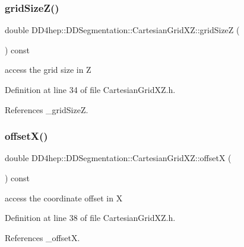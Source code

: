 \subsubsection{\texorpdfstring{grid\+Size\+Z()}{gridSizeZ()}}
{\footnotesize\ttfamily double D\+D4hep\+::\+D\+D\+Segmentation\+::\+Cartesian\+Grid\+X\+Z\+::grid\+SizeZ (\begin{DoxyParamCaption}{ }\end{DoxyParamCaption}) const\hspace{0.3cm}{\ttfamily [inline]}}



access the grid size in Z 



Definition at line 34 of file Cartesian\+Grid\+X\+Z.\+h.



References \+\_\+grid\+SizeZ.

\hypertarget{class_d_d4hep_1_1_d_d_segmentation_1_1_cartesian_grid_x_z_a5e1370da40ec8f75e1b205910c6e698c}{}\label{class_d_d4hep_1_1_d_d_segmentation_1_1_cartesian_grid_x_z_a5e1370da40ec8f75e1b205910c6e698c} 
\subsubsection{\texorpdfstring{offset\+X()}{offsetX()}}
{\footnotesize\ttfamily double D\+D4hep\+::\+D\+D\+Segmentation\+::\+Cartesian\+Grid\+X\+Z\+::offsetX (\begin{DoxyParamCaption}{ }\end{DoxyParamCaption}) const\hspace{0.3cm}{\ttfamily [inline]}}



access the coordinate offset in X 



Definition at line 38 of file Cartesian\+Grid\+X\+Z.\+h.



References \+\_\+offsetX.

\hypertarget{class_d_d4hep_1_1_d_d_segmentation_1_1_cartesian_grid_x_z_a114a46c5328dfdf6bd4ed5d04bf8ec29}{}\label{class_d_d4hep_1_1_d_d_segmentation_1_1_cartesian_grid_x_z_a114a46c5328dfdf6bd4ed5d04bf8ec29} 
